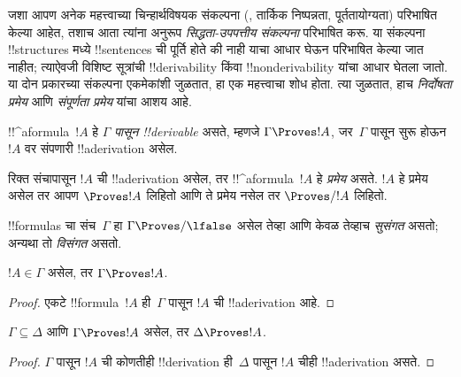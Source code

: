 \documentclass[../../../include/open-logic-section]{subfiles}
\begin{document}
      {}
      {}


\begin{explain}
जशा आपण अनेक महत्त्वाच्या चिन्हार्थविषयक संकल्पना
(, तार्किक निष्पन्नता, पूर्ततायोग्यता)
परिभाषित केल्या आहेत, तशाच आता त्यांना अनुरूप
\emph{सिद्धता-उपपत्तीय संकल्पना} परिभाषित करू. या संकल्पना !!{structure}s
मध्ये !!{sentence}s ची पूर्ति होते की नाही याचा आधार घेऊन परिभाषित केल्या
जात नाहीत; त्याऐवजी विशिष्ट सूत्रांची !!{derivability} किंवा
!!{nonderivability} यांचा आधार घेतला जातो. या दोन प्रकारच्या संकल्पना
एकमेकांशी जुळतात, हा एक महत्त्वाचा शोध होता. त्या जुळतात, हाच
\emph{निर्दोषता प्रमेय} आणि \emph{संपूर्णता प्रमेय} यांचा आशय आहे.
\end{explain}

\begin{defn}[!!^{derivability}]
!!^a{formula}~$!A$ हे $\Gamma$ \emph{पासून !!{derivable}} असते, म्हणजे
$\Gamma \Proves !A$, जर~$\Gamma$ पासून सुरू होऊन~$!A$ वर संपणारी
!!a{derivation} असेल.
\end{defn}

\begin{defn}[प्रमेये]
रिक्त संचापासून $!A$ ची !!a{derivation} असेल, तर !!^a{formula}~$!A$ हे
\emph{प्रमेय} असते. $!A$ हे प्रमेय असेल तर आपण $\Proves !A$ लिहितो आणि
ते प्रमेय नसेल तर $\Proves/ !A$ लिहितो.
\end{defn}

\begin{defn}[सुसंगतता]
!!{formula}s चा संच~$\Gamma$ हा $\Gamma\Proves/ \lfalse$ असेल तेव्हा आणि
केवळ तेव्हाच \emph{सुसंगत} असतो; अन्यथा तो \emph{विसंगत} असतो.
\end{defn}

\begin{prop}[परावर्तिता]
$!A \in \Gamma$ असेल, तर $\Gamma \Proves !A$.
\end{prop}

\begin{proof}
  एकटे !!{formula}~$!A$ ही~$\Gamma$ पासून $!A$ ची !!a{derivation} आहे.
\end{proof}

\begin{prop}[एकस्वनिकता]
$\Gamma \subseteq \Delta$ आणि $\Gamma \Proves !A$ असेल, तर $\Delta
\Proves !A$.
\end{prop}

\begin{proof}
$\Gamma$ पासून $!A$ ची कोणतीही !!{derivation} ही~$\Delta$ पासून $!A$ चीही
!!a{derivation} असते.
\end{proof}
\end{document}
